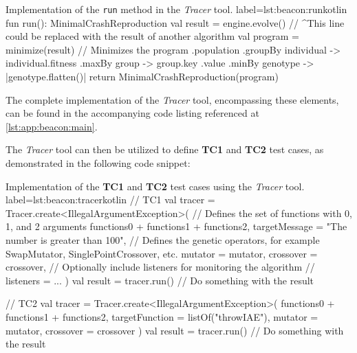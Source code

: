         \begin{code}{%
            Implementation of the \texttt{run} method in the \textit{Tracer} tool.
        }{label=lst:beacon:run}{kotlin}
            fun run(): MinimalCrashReproduction {
                val result = engine.evolve() // ^This line could be replaced with the result of another algorithm
                val program = minimize(result)  // Minimizes the program
                    .population
                    .groupBy { individual -> individual.fitness }
                    .maxBy { group -> group.key }.value
                    .minBy { genotype -> |genotype.flatten()| }
                return MinimalCrashReproduction(program)
            }
        \end{code}

        The complete implementation of the \textit{Tracer} tool, encompassing these elements, can be found in the 
        accompanying code listing referenced at \vref{lst:app:beacon:main}.
    
        The \textit{Tracer} tool can then be utilized to define \textbf{TC1} and \textbf{TC2} test cases, as
        demonstrated in the following code snippet:

        \begin{code}{%
            Implementation of the \textbf{TC1} and \textbf{TC2} test cases using the \textit{Tracer} tool.
        }{label=lst:beacon:tracer}{kotlin}
            // TC1
            val tracer = Tracer.create<IllegalArgumentException>(
                // Defines the set of functions with 0, 1, and 2 arguments
                functions0 + functions1 + functions2,
                targetMessage = "The number is greater than 100",
                // Defines the genetic operators, for example SwapMutator, SinglePointCrossover, etc.
                mutator = mutator,
                crossover = crossover,
                // Optionally include listeners for monitoring the algorithm
                // listeners = ...
            )
            val result = tracer.run()
            // Do something with the result

            // TC2
            val tracer = Tracer.create<IllegalArgumentException>(
                functions0 + functions1 + functions2,
                targetFunction = listOf("throwIAE"),
                mutator = mutator,
                crossover = crossover
            )
            val result = tracer.run()
            // Do something with the result
        \end{code}